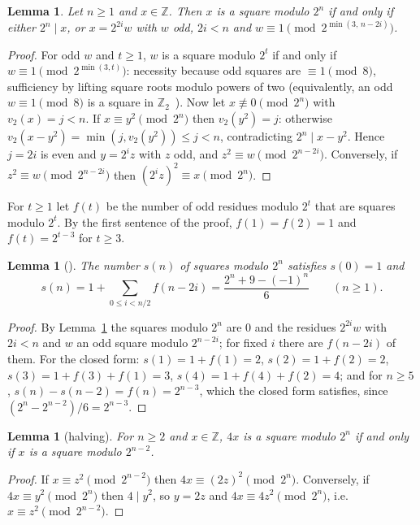 \documentclass[11pt]{amsart}
\newtheorem{lemma}[theorem]{Lemma}
\theoremstyle{remark}
\newcommand{\Z}{\mathbb{Z}}
\begin{document}
\begin{lemma}\label{lem:squares}
Let $n\ge1$ and $x\in\Z$. Then $x$ is a square modulo $2^n$ if and only if either $2^n\mid x$, or $x=2^{2i}w$ with $w$ odd, $2i<n$ and $w\equiv1\pmod{2^{\min(3,\,n-2i)}}$.
\end{lemma}

\begin{proof}
For odd $w$ and $t\ge1$, $w$ is a square modulo $2^t$ if and only if $w\equiv1\pmod{2^{\min(3,t)}}$: necessity because odd squares are $\equiv1\pmod 8$, sufficiency by lifting square roots modulo powers of two (equivalently, an odd $w\equiv1\pmod8$ is a square in $\Z_2$~\cite[Ch.~II, Thm.~4]{serre}). Now let $x\not\equiv0\pmod{2^n}$ with $v_2(x)=j<n$. If $x\equiv y^2\pmod{2^n}$ then $v_2(y^2)=j$: otherwise $v_2(x-y^2)=\min(j,v_2(y^2))\le j<n$, contradicting $2^n\mid x-y^2$. Hence $j=2i$ is even and $y=2^iz$ with $z$ odd, and $z^2\equiv w\pmod{2^{n-2i}}$. Conversely, if $z^2\equiv w\pmod{2^{n-2i}}$ then $(2^iz)^2\equiv x\pmod{2^n}$.
\end{proof}

For $t\ge1$ let $f(t)$ be the number of odd residues modulo $2^t$ that are squares modulo $2^t$. By the first sentence of the proof, $f(1)=f(2)=1$ and $f(t)=2^{t-3}$ for $t\ge3$.

\begin{lemma}[{\cite{stangl}}]\label{lem:sqcount}
The number $s(n)$ of squares modulo $2^n$ satisfies $s(0)=1$ and
\[
s(n)=1+\sum_{0\le i<n/2} f(n-2i)=\frac{2^n+9-(-1)^n}{6}\qquad(n\ge1).
\]
\end{lemma}

\begin{proof}
By Lemma~\ref{lem:squares} the squares modulo $2^n$ are $0$ and the residues $2^{2i}w$ with $2i<n$ and $w$ an odd square modulo $2^{n-2i}$; for fixed $i$ there are $f(n-2i)$ of them. For the closed form: $s(1)=1+f(1)=2$, $s(2)=1+f(2)=2$, $s(3)=1+f(3)+f(1)=3$, $s(4)=1+f(4)+f(2)=4$; and for $n\ge5$, $s(n)-s(n-2)=f(n)=2^{n-3}$, which the closed form satisfies, since $(2^n-2^{n-2})/6=2^{n-3}$.
\end{proof}

\begin{lemma}[halving]\label{lem:halving}
For $n\ge2$ and $x\in\Z$, $4x$ is a square modulo $2^n$ if and only if $x$ is a square modulo $2^{n-2}$.
\end{lemma}

\begin{proof}
If $x\equiv z^2\pmod{2^{n-2}}$ then $4x\equiv(2z)^2\pmod{2^n}$. Conversely, if $4x\equiv y^2\pmod{2^n}$ then $4\mid y^2$, so $y=2z$ and $4x\equiv4z^2\pmod{2^n}$, i.e.\ $x\equiv z^2\pmod{2^{n-2}}$.
\end{proof}
\end{document}
